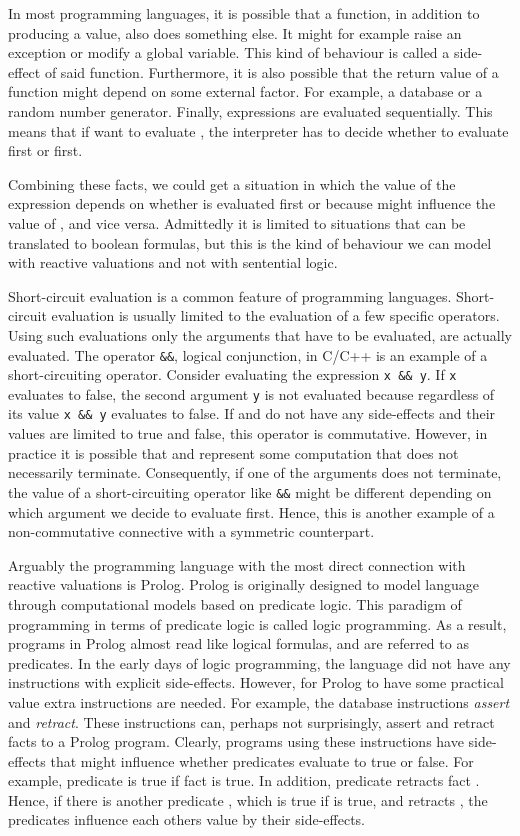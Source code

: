 \documentclass[a4paper,twoside,openright]{report}
\begin{document}
In most programming languages, it is possible that a function, in addition to producing a value, also does something else. It might for example raise an exception or modify a global variable. This kind of behaviour is called a side-effect of said function. Furthermore, it is also possible that the return value of a function might depend on some external factor. For example, a database or a random number generator. Finally, expressions are evaluated sequentially. This means that if want to evaluate , the interpreter has to decide whether to evaluate  first or  first.

Combining these facts, we could get a situation in which the value of the expression  depends on whether  is evaluated first or  because  might influence the value of , and vice versa. Admittedly it is limited to situations that can be translated to boolean formulas, but this is the kind of behaviour we can model with reactive valuations and not with sentential logic.

Short-circuit evaluation is a common feature of programming languages. Short-circuit evaluation is usually limited to the evaluation of a few specific operators. Using such evaluations only the arguments that have to be evaluated, are actually evaluated. The operator \verb+&&+, logical conjunction, in C/C++ is an example of a short-circuiting operator. Consider evaluating the expression \verb+x && y+. If \verb+x+ evaluates to false, the second argument \verb+y+ is not evaluated because regardless of its value \verb+x && y+ evaluates to false. If  and  do not have any side-effects and their values are limited to true and false, this operator is commutative. However, in practice it is possible that  and  represent some computation that does not necessarily terminate. Consequently, if one of the arguments does not terminate, the value of a short-circuiting operator like \verb+&&+ might be different depending on which argument we decide to evaluate first. Hence, this is another example of a non-commutative connective with a symmetric counterpart.

Arguably the programming language with the most direct connection with reactive valuations is Prolog. Prolog is originally designed to model language through computational models based on predicate logic. This paradigm of programming in terms of predicate logic is called logic programming. As a result, programs in Prolog almost read like logical formulas, and are referred to as predicates. In the early days of logic programming, the language did not have any instructions with explicit side-effects. However, for Prolog to have some practical value extra instructions are needed. For example, the database instructions \emph{assert} and \emph{retract}. These instructions can, perhaps not surprisingly, assert and retract facts to a Prolog program. Clearly, programs using these instructions have side-effects that might influence whether predicates evaluate to true or false. For example, predicate  is true if fact  is true. In addition, predicate  retracts fact . Hence, if there is another predicate , which is true if  is true, and retracts , the predicates influence each others value by their side-effects.
\end{document}
